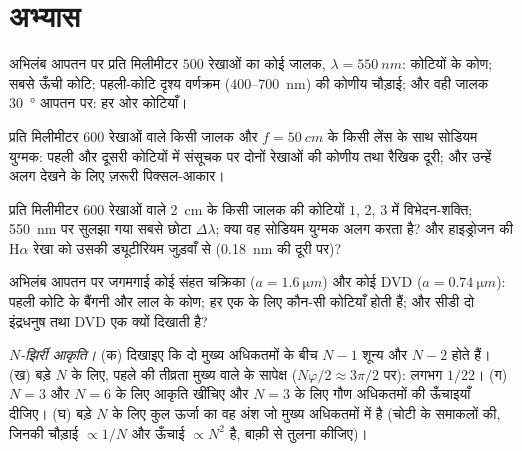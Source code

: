 \section{अभ्यास}

\begin{exercise}[$\star$]\label{exo:b2:gratings:1}
अभिलंब आपतन पर प्रति मिलीमीटर $500$ रेखाओं का कोई जालक, $\lambda =
\qty{550}{nm}$: कोटियों के कोण; सबसे ऊँची कोटि; पहली-कोटि दृश्य वर्णक्रम
($400$--\qty{700}{nm}) की कोणीय चौड़ाई; और वही जालक
\qty{30}{\degree} आपतन पर: हर ओर कोटियाँ।
\end{exercise}

\begin{exercise}[$\star$]\label{exo:b2:gratings:2}
प्रति मिलीमीटर $600$ रेखाओं वाले किसी जालक और $f =
\qty{50}{cm}$ के किसी लेंस के साथ सोडियम युग्मक: पहली और दूसरी कोटियों में
संसूचक पर दोनों रेखाओं की कोणीय तथा रैखिक दूरी; और उन्हें अलग देखने के
लिए ज़रूरी पिक्सल-आकार।
\end{exercise}

\begin{exercise}[$\star$]\label{exo:b2:gratings:3}
प्रति मिलीमीटर $600$ रेखाओं वाले \qty{2}{cm} के किसी जालक की कोटियों $1$, $2$,
$3$ में विभेदन-शक्ति; \qty{550}{nm} पर सुलझा गया सबसे छोटा $\Delta\lambda$; क्या वह सोडियम
युग्मक अलग करता है? और हाइड्रोजन की H$\alpha$ रेखा को उसकी ड्यूटीरियम जुड़वाँ से (\qty{0.18}{nm}
की दूरी पर)?
\end{exercise}

\begin{exercise}[$\star$]\label{exo:b2:gratings:4}
अभिलंब आपतन पर जगमगाई कोई संहत चक्रिका ($a = \qty{1.6}{\micro m}$) और कोई DVD ($a = \qty{0.74}{\micro m}$):
पहली कोटि के बैंगनी और लाल के कोण; हर एक के लिए कौन-सी कोटियाँ
होती हैं; और सीडी दो इंद्रधनुष तथा DVD एक क्यों दिखाती है?
\end{exercise}

\begin{exercise}[$\star\star$]\label{exo:b2:gratings:5}
\emph{$N$-झिर्री आकृति।} (क) दिखाइए कि दो मुख्य अधिकतमों के बीच
$N - 1$ शून्य और $N - 2$  होते हैं। (ख) बड़े $N$ के लिए,
पहले  की तीव्रता मुख्य वाले के सापेक्ष
($N\varphi/2 \approx 3\pi/2$ पर): लगभग $1/22$। (ग)
$N = 3$ और $N = 6$ के लिए आकृति खींचिए और $N = 3$ के लिए गौण अधिकतमों की ऊँचाइयाँ
दीजिए। (घ) बड़े $N$ के लिए कुल ऊर्जा का वह अंश जो मुख्य अधिकतमों में है
(चोटी के समाकलों की, जिनकी चौड़ाई $\propto 1/N$ और ऊँचाई
$\propto N^2$ है, बाक़ी से तुलना कीजिए)।
\end{exercise}

